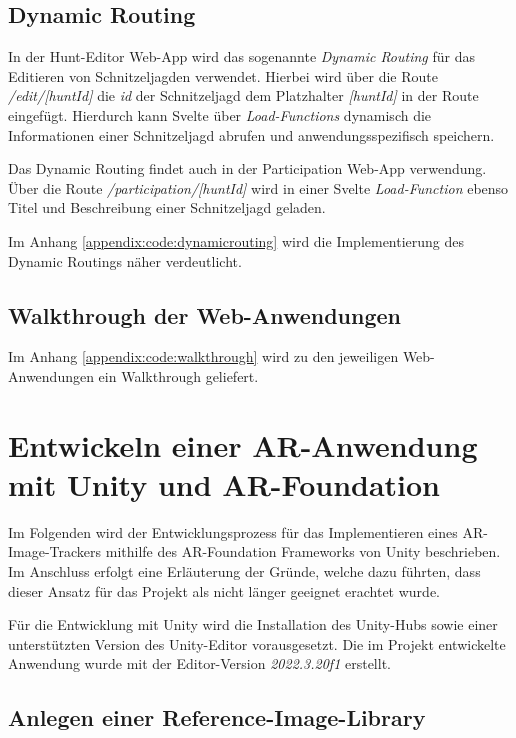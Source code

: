 \subsection{Dynamic Routing}

In der Hunt-Editor Web-App wird das sogenannte \textit{Dynamic Routing} für das Editieren von Schnitzeljagden verwendet. Hierbei wird über die Route \textit{/edit/[huntId]} die \textit{id} der Schnitzeljagd dem Platzhalter \textit{[huntId]} in der Route eingefügt. Hierdurch kann Svelte über \textit{Load-Functions} dynamisch die Informationen einer Schnitzeljagd abrufen und anwendungsspezifisch speichern.

Das Dynamic Routing findet auch in der Participation Web-App verwendung. Über die Route \textit{/participation/[huntId]} wird in einer Svelte \textit{Load-Function} ebenso Titel und Beschreibung einer Schnitzeljagd geladen.

Im Anhang \ref{appendix:code:dynamicrouting} wird die Implementierung des Dynamic Routings näher verdeutlicht.

\subsection{Walkthrough der Web-Anwendungen}

Im Anhang \ref{appendix:code:walkthrough} wird zu den jeweiligen Web-Anwendungen ein Walkthrough geliefert.

\section{Entwickeln einer AR-Anwendung mit Unity und AR-Foundation} \label{cha:implementierung:unityardev}

Im Folgenden wird der Entwicklungsprozess für das Implementieren eines AR-Image-Trackers mithilfe des AR-Foundation Frameworks von Unity beschrieben. Im Anschluss erfolgt eine Erläuterung der Gründe, welche dazu führten, dass dieser Ansatz für das Projekt als nicht länger geeignet erachtet wurde.

Für die Entwicklung mit Unity wird die Installation des Unity-Hubs sowie einer unterstützten Version des Unity-Editor vorausgesetzt. Die im Projekt entwickelte Anwendung wurde mit der Editor-Version \textit{2022.3.20f1} erstellt.

\subsection{Anlegen einer Reference-Image-Library}

